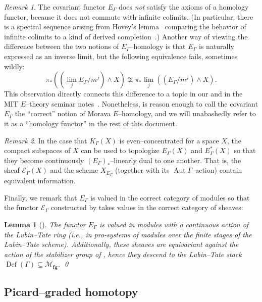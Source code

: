 \documentclass{amsart}
\newcommand{\m}{m}
\newcommand{\<}{\langle}
\renewcommand{\>}{\rangle}
\newcommand{\sm}{\wedge}
\newcommand{\moduli}[1]{\mathcal{M}_{\mathbf{#1}}}
\newcommand{\sheaf}[1]{\mathcal{#1}}
\DeclareMathOperator{\Aut}{Aut}
\theoremstyle{plain}
\newtheorem*{lemma}{Lemma}
\theoremstyle{definition}
\theoremstyle{remark}
\newtheorem*{remark}{Remark}
\begin{document}
\begin{remark}
The covariant functor $E_\Gamma$ does \emph{not} satisfy the axioms of a homology functor, because it does not commute with infinite colimits.  (In particular, there is a spectral sequence arising from Hovey's lemma~\cite[Lemma 2.3]{HoveyCSC} comparing the behavior of infinite colimits to a kind of derived completion~\cite{HoveyFilteredColimits}.)  Another way of viewing the difference between the two notions of $E_\Gamma$--homology is that $E_\Gamma$ is naturally expressed as an inverse limit, but the following equivalence fails, sometimes wildly: \[\pi_* \left(\left(\lim_j E_\Gamma / \m^j\right) \sm X\right) \not\cong \pi_* \lim_j \left( (E_\Gamma / \m^j) \sm X \right).\] This observation directly connects this difference to a topic in our  and in the MIT $E$--theory seminar notes~\cite[Section 14]{MITETheory}.  Nonetheless,  is reason enough to call the covariant $E_\Gamma$ the ``correct'' notion of Morava $E$--homology, and we will unabashedly refer to it as a ``homology functor'' in the rest of this document.
\end{remark}

\begin{remark}
In the case that $K_\Gamma(X)$ is even--concentrated for a space $X$, the compact subspaces of $X$ can be used to topologize $E_\Gamma(X)$ and $E_\Gamma^*(X)$ so that they become continuously $(E_\Gamma)_*$--linearly dual to one another.  That is, the sheaf $\sheaf E_\Gamma(X)$ and the scheme $X_{E_\Gamma}$ (together with its $\Aut \Gamma$--action) contain equivalent information.
\end{remark}

Finally, we remark that $E_\Gamma$ is valued in the correct category of modules so that the functor $\sheaf E_\Gamma$ constructed by  takes values in the correct category of sheaves:
\begin{lemma}[{\cite[Theorem 12]{StricklandGHDuality}}]\label{EthyGivesASheaf}
The functor $E_\Gamma$ is valued in modules with a continuous action of the Lubin--Tate ring (i.e., in pro-systems of modules over the finite stages of the Lubin--Tate scheme).  Additionally, these sheaves are equivariant against the action of the stabilizer group of , hence they descend to the Lubin--Tate stack $\operatorname{Def}(\Gamma) \subseteq \moduli{fg}$. \qed
\end{lemma}


\subsection{Picard--graded homotopy}\label{SectionPicardGradedHomotopy}
\end{document}

